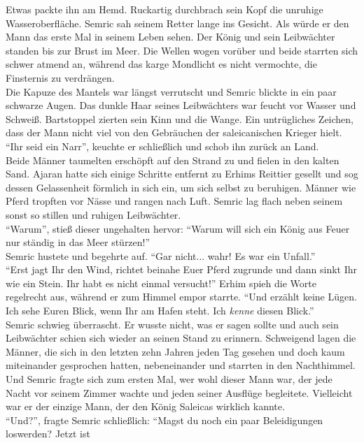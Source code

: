 Etwas packte ihn am Hemd. Ruckartig durchbrach sein Kopf die unruhige Wasseroberfläche. Semric sah 
seinem Retter lange ins Gesicht. Als würde er den Mann das erste Mal in seinem Leben sehen. Der 
König und sein Leibwächter standen bis zur Brust im Meer. Die Wellen wogen vorüber und beide 
starrten sich schwer atmend an, während das karge Mondlicht es nicht vermochte, die Finsternis zu 
verdrängen. \\
Die Kapuze des Mantels war längst verrutscht und Semric blickte in ein paar schwarze Augen. Das 
dunkle Haar seines Leibwächters war feucht vor Wasser und Schweiß. Bartstoppel zierten sein Kinn 
und die Wange. Ein untrügliches Zeichen, dass der Mann nicht viel von den Gebräuchen der 
saleicanischen Krieger hielt. \\
``Ihr seid ein Narr'', keuchte er schließlich und schob ihn zurück an Land. \\
Beide Männer taumelten erschöpft auf den Strand zu und fielen in den kalten Sand. Ajaran hatte sich 
einige Schritte entfernt zu Erhims Reittier gesellt und sog dessen Gelassenheit förmlich in sich 
ein, um sich selbst zu beruhigen. Männer wie Pferd tropften vor Nässe und rangen nach Luft. 
Semric lag flach neben seinem sonst so stillen und ruhigen Leibwächter. \\
``Warum'', stieß dieser ungehalten hervor: ``Warum will sich ein König aus Feuer nur ständig in das 
Meer stürzen!''\\
Semric hustete und begehrte auf. ``Gar nicht... wahr! Es war ein Unfall.''\\
``Erst jagt Ihr den Wind, richtet beinahe Euer Pferd zugrunde und dann sinkt Ihr wie ein Stein. Ihr 
habt es nicht einmal versucht!'' Erhim spieh die Worte regelrecht aus, während er zum Himmel empor 
starrte. ``Und erzählt keine Lügen. Ich sehe Euren Blick, wenn Ihr am Hafen steht. Ich \emph{kenne} 
diesen Blick.''\\
Semric schwieg überrascht. Er wusste nicht, was er sagen sollte und auch sein Leibwächter schien 
sich wieder an seinen Stand zu erinnern. Schweigend lagen die Männer, die sich in den letzten zehn 
Jahren jeden Tag gesehen und doch kaum miteinander gesprochen hatten, nebeneinander und starrten in 
den Nachthimmel. Und Semric fragte sich zum ersten Mal, wer wohl dieser Mann war, der jede Nacht 
vor seinem Zimmer wachte und jeden seiner Ausflüge begleitete. Vielleicht war er der einzige Mann, 
der den König Saleicas wirklich kannte.\\
``Und?'', fragte Semric schließlich: ``Magst du noch ein paar Beleidigungen loswerden? Jetzt ist 
